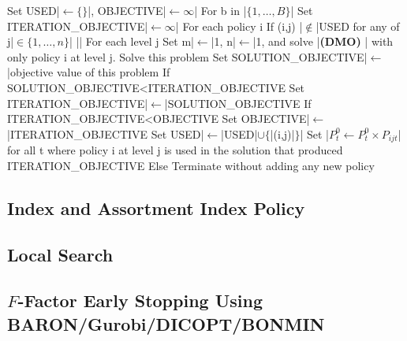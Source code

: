 \documentclass{article}
\newcommand{\model}{{\bf (DMO) }}
\begin{document}
\begin{pseudocode}
    Set USED|$\leftarrow\{\}$|, OBJECTIVE|$\leftarrow\infty$|
    For b in |$\{1,\ldots,B\}$|
        Set ITERATION_OBJECTIVE|$\leftarrow\infty$|
        For each policy i
            If (i,j) |$\not\in$|USED for any of j|$\in\{1,\ldots,n\}$| ||
                For each level j
                    Set m|$\leftarrow$|1, n|$\leftarrow$|1, and solve |\model| with only policy i at level j.
                    Solve this problem
                    Set SOLUTION_OBJECTIVE|$\leftarrow$|objective value of this problem
                    If SOLUTION_OBJECTIVE<ITERATION_OBJECTIVE
                        Set ITERATION_OBJECTIVE|$\leftarrow$|SOLUTION_OBJECTIVE
        If ITERATION_OBJECTIVE<OBJECTIVE
            Set OBJECTIVE|$\leftarrow$|ITERATION_OBJECTIVE
            Set USED|$\leftarrow$|USED|$\cup\{$|(i,j)|$\}$|
            Set |$P_t^0\leftarrow P_t^0\times P_{ijt}$| for all t where policy i at level j is used in the solution that produced ITERATION_OBJECTIVE
        Else
            Terminate without adding any new policy
\end{pseudocode}



\subsection{Index and Assortment Index Policy}
\subsection{Local Search}

\subsection{$F$-Factor Early Stopping Using BARON/Gurobi/DICOPT/BONMIN}\label{sec:early_stopping}
\end{document}
